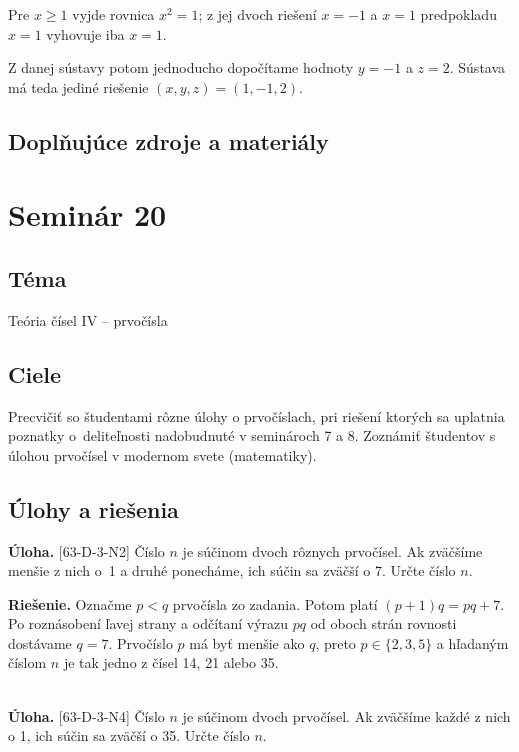 \documentclass[11pt,a4paper,oneside,final]{book}
\newcommand{\ul}{\textbf{Úloha.} }
\newcommand{\rie}{\textbf{Riešenie.} }
\begin{document}
Pre $x \geq 1$ vyjde rovnica $x^2 = 1$; z jej dvoch riešení $x = -1$ a $x = 1$ predpokladu $x = 1$ vyhovuje iba $x = 1$.

Z danej sústavy potom jednoducho dopočítame hodnoty $y = -1$ a $z = 2$. Sústava má teda jediné riešenie $(x, y, z) = (1, -1, 2).$\\
\subsection*{Doplňujúce zdroje a materiály}

\newpage
\section*{Seminár 20}
\subsection*{Téma}
Teória čísel IV -- prvočísla

\subsection*{Ciele}
Precvičiť so študentami rôzne úlohy o prvočíslach, pri riešení ktorých sa uplatnia poznatky o~deliteľnosti nadobudnuté v seminároch 7 a 8. Zoznámiť študentov s úlohou prvočísel v modernom svete (matematiky).

\subsection*{Úlohy a riešenia}
\begin{tcolorbox}[breakable,notitle,boxrule=0pt,colback=light-gray,colframe=light-gray]\ul [63-D-3-N2] Číslo $n$ je súčinom dvoch rôznych prvočísel. Ak zväčšíme menšie z nich o~1 a druhé ponecháme, ich súčin sa zväčší o 7. Určte číslo $n$.

\end{tcolorbox}

\rie Označme $p<q$ prvočísla zo zadania. Potom platí $(p+1)q=pq+7$. Po roznásobení ľavej strany a odčítaní výrazu $pq$ od oboch strán rovnosti dostávame $q=7$. Prvočíslo $p$ má byť menšie ako $q$, preto $p\in \{2,3,5\}$ a hľadaným číslom $n$ je tak jedno z čísel 14, 21 alebo 35.\\
\\
\begin{tcolorbox}[breakable,notitle,boxrule=0pt,colback=light-gray,colframe=light-gray]\ul [63-D-3-N4] Číslo $n$ je súčinom dvoch prvočísel. Ak zväčšíme každé z nich o 1, ich súčin sa zväčší o 35. Určte číslo $n$.

\end{tcolorbox}
\end{document}
